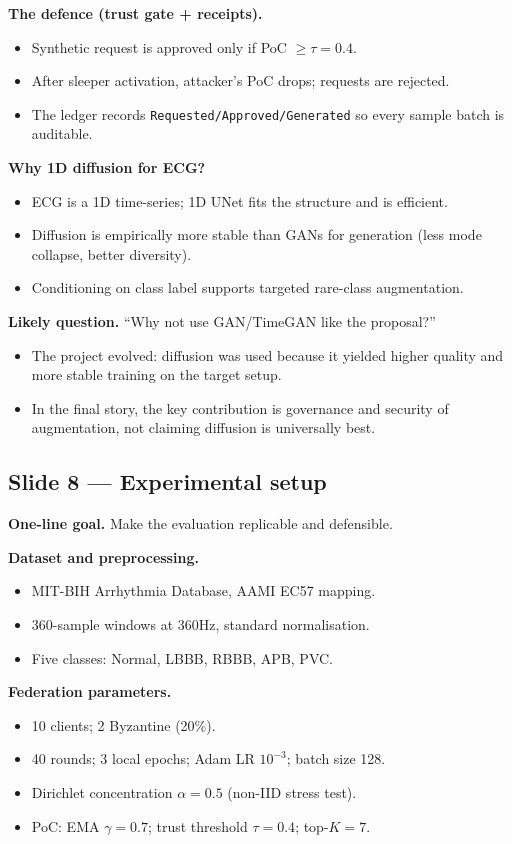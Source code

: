 \documentclass[11pt,a4paper]{article}
\begin{document}
\textbf{The defence (trust gate + receipts).}
\begin{itemize}
\item Synthetic request is approved only if PoC $\ge \tau=0.4$.
\item After sleeper activation, attacker’s PoC drops; requests are rejected.
\item The ledger records \texttt{Requested/Approved/Generated} so every sample batch is auditable.
\end{itemize}

\textbf{Why 1D diffusion for ECG?}
\begin{itemize}
\item ECG is a 1D time-series; 1D UNet fits the structure and is efficient.
\item Diffusion is empirically more stable than GANs for generation (less mode collapse, better diversity).
\item Conditioning on class label supports targeted rare-class augmentation.
\end{itemize}

\textbf{Likely question.} ``Why not use GAN/TimeGAN like the proposal?''
\begin{itemize}
\item The project evolved: diffusion was used because it yielded higher quality and more stable training on the target setup.
\item In the final story, the key contribution is governance and security of augmentation, not claiming diffusion is universally best.
\end{itemize}

\subsection{Slide 8 --- Experimental setup}
\textbf{One-line goal.} Make the evaluation replicable and defensible.

\textbf{Dataset and preprocessing.}
\begin{itemize}
\item MIT-BIH Arrhythmia Database, AAMI EC57 mapping.
\item 360-sample windows at 360Hz, standard normalisation.
\item Five classes: Normal, LBBB, RBBB, APB, PVC.
\end{itemize}

\textbf{Federation parameters.}
\begin{itemize}
\item 10 clients; 2 Byzantine (20\%).
\item 40 rounds; 3 local epochs; Adam LR $10^{-3}$; batch size 128.
\item Dirichlet concentration $\alpha=0.5$ (non-IID stress test).
\item PoC: EMA $\gamma=0.7$; trust threshold $\tau=0.4$; top-$K=7$.
\end{itemize}
\end{document}
